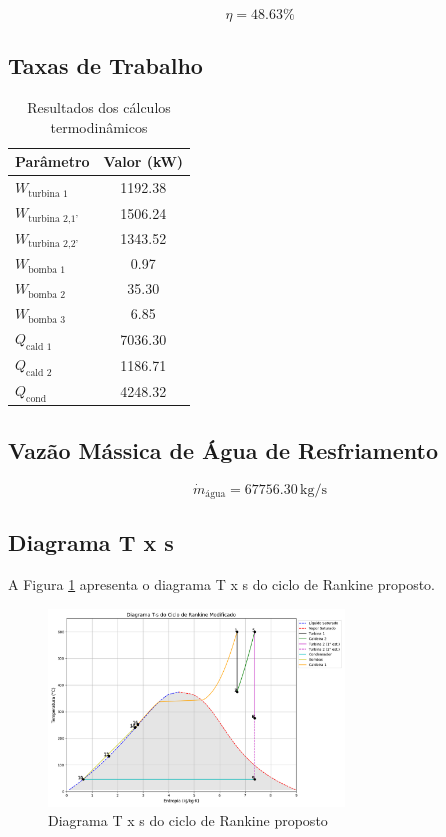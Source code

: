\documentclass[
	article,			%
	11pt,				%
	oneside,			%
	a4paper,			%
	english,			%
	brazil,				%
	sumario=tradicional
	]{abntex2}
\begin{document}
$$\eta = 48.63\%$$

\subsection{Taxas de Trabalho}

\begin{table}[ht]
	\centering
	\caption{Resultados dos cálculos termodinâmicos}
	\label{tab:calculos}
	\begin{tabular}{lS[table-format=4.2]}
	\toprule
	{Parâmetro} & {Valor (\si{\kilo\watt})} \\
	\midrule
	$W_{\text{turbina 1}}$               & 1192.38 \\
	$W_{\text{turbina 2,1'}}$ & 1506.24 \\
	$W_{\text{turbina 2,2'}}$ & 1343.52 \\
	$W_{\text{bomba 1}}$                  &    0.97 \\
	$W_{\text{bomba 2}}$                  &   35.30 \\
	$W_{\text{bomba 3}}$                  &    6.85 \\
	$Q_{\text{cald 1}}$                   & 7036.30 \\
	$Q_{\text{cald 2}}$                   & 1186.71 \\
	$Q_{\text{cond}}$                     & 4248.32 \\
	\bottomrule
	\end{tabular}
	\end{table}

\subsection{Vazão Mássica de Água de Resfriamento}

$$\dot{m}_{\text{água}} = 67756.30 \, \si{\kilo\gram\per\second}$$

\subsection{Diagrama T x s}

A Figura \ref{fig:ts} apresenta o diagrama T x s do ciclo de Rankine proposto.

\begin{figure}[h]
	\centering
	\includegraphics[width=0.7\textwidth]{./images/ts.png}
	\caption{Diagrama T x s do ciclo de Rankine proposto}
	\label{fig:ts}
\end{figure}
\end{document}
